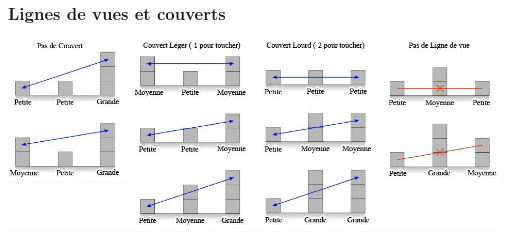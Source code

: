 \subsubsection*{Lignes de vues et couverts}
\begin{center}
\includegraphics[width=13cm]{Lignes_de_vue2.png}
\end{center}

\newpage

